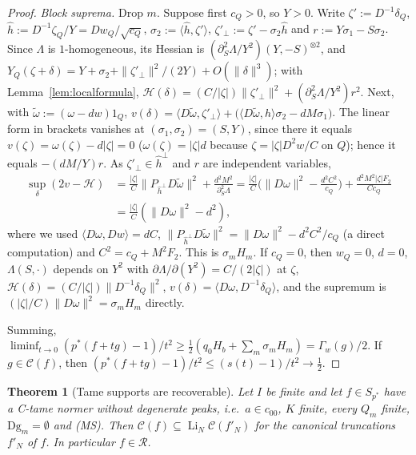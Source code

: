 \documentclass[10pt]{amsart}
\newtheorem{theorem}{Theorem}[section]
\theoremstyle{definition}
\theoremstyle{remark}
\newcommand{\Cset}{\mathcal C}
\newcommand{\Li}{\operatorname*{Li}}
\newcommand{\Rec}{\mathcal R}
\newcommand{\ip}[2]{\langle #1,#2\rangle}
\begin{document}
\begin{proof}
\emph{Block suprema.}  Drop $m$.  Suppose first $c_Q>0$, so $Y>0$.  Write
$\zeta':=D^{-1}\delta_Q$, $\hat h:=D^{-1}\zeta_Q/Y=D w_Q/\sqrt{c_Q}$,
$\sigma_2:=\ip{\hat h}{\zeta'}$, $\zeta'_\perp:=\zeta'-\sigma_2\hat h$ and
$r:=Y\sigma_1-S\sigma_2$.  Since $\Lambda$ is $1$-homogeneous, its Hessian
is $(\partial_S^2\Lambda/Y^2)(Y,-S)^{\otimes2}$, and
$Y_Q(\zeta+\delta)=Y+\sigma_2+\|\zeta'_\perp\|^2/(2Y)+O(\|\delta\|^3)$;
with Lemma~\ref{lem:localformula},
$\mathcal H(\delta)=(C/|\zeta|)\|\zeta'_\perp\|^2+(\partial_S^2\Lambda/Y^2)
r^2$.  Next, with $\tilde\omega:=(\omega-dw)1_Q$,
$v(\delta)=\ip{D\tilde\omega}{\zeta'_\perp}+\big(\ip{D\tilde\omega}{\hat h}
\sigma_2-dM\sigma_1\big)$.  The linear form in brackets vanishes at
$(\sigma_1,\sigma_2)=(S,Y)$, since there it equals $v(\zeta)=\omega(\zeta)
-d|\zeta|=0$ ($\omega(\zeta)=|\zeta|d$ because $\zeta=|\zeta|D^2w/C$ on $Q$);
hence it equals $-(dM/Y)r$.  As $\zeta'_\perp\in\hat h^\perp$ and $r$ are
independent variables,
\begin{align*}
 \sup_\delta(2v-\mathcal H)&=\frac{|\zeta|}C\|P_{\hat h^\perp}D\tilde\omega
 \|^2+\frac{d^2M^2}{\partial_S^2\Lambda}
 =\frac{|\zeta|}C\Big(\|D\omega\|^2-\frac{d^2C^2}{c_Q}\Big)+
 \frac{d^2M^2|\zeta|F_2}{Cc_Q}\\
 &=\frac{|\zeta|}C(\|D\omega\|^2-d^2),
\end{align*}
where we used $\ip{D\omega}{Dw}=dC$, $\|P_{\hat h^\perp}D\tilde\omega\|^2=
\|D\omega\|^2-d^2C^2/c_Q$ (a direct computation) and $C^2=c_Q+M^2F_2$.  This
is $\sigma_mH_m$.  If $c_Q=0$, then $w_Q=0$, $d=0$, $\Lambda(S,\cdot)$
depends on $Y^2$ with $\partial\Lambda/\partial(Y^2)=C/(2|\zeta|)$ at
$\zeta$, $\mathcal H(\delta)=(C/|\zeta|)\|D^{-1}\delta_Q\|^2$,
$v(\delta)=\ip{D\omega}{D^{-1}\delta_Q}$, and the supremum is
$(|\zeta|/C)\|D\omega\|^2=\sigma_mH_m$ directly.

Summing, $\liminf_{t\to0}(p^*(f+tg)-1)/t^2\ge\frac12(q_0H_b+\sum_m\sigma_m
H_m)=\Gamma_w(g)/2$.  If $g\in\Cset(f)$, then $(p^*(f+tg)-1)/t^2\le
(s(t)-1)/t^2\to\frac12$.
\end{proof}

\begin{theorem}[Tame supports are recoverable]\label{thm:tame}
Let $I$ be finite and let $f\in S_{p^*}$ have a C-tame normer without
degenerate peaks, i.e.\ $a\in c_{00}$, $K$ finite, every $Q_m$ finite,
$\mathrm{Dg}_m=\emptyset$ and \textup{(MS)}.  Then
$\Cset(f)\subseteq\Li_N\Cset(f'_N)$ for the canonical truncations
$f'_N$ of $f$.  In particular $f\in\Rec$.
\end{theorem}
\end{document}
